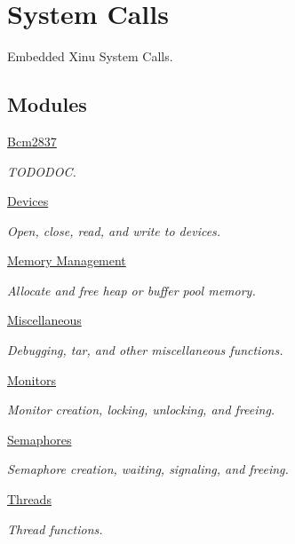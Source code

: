 \hypertarget{group__system}{\section{System Calls}
\label{group__system}
}


Embedded Xinu System Calls.  


\subsection*{Modules}
\begin{DoxyCompactItemize}
\item 
\hyperlink{group__bcm2837}{Bcm2837}
\begin{DoxyCompactList}\small\item\em T\-O\-D\-O\-D\-O\-C. \end{DoxyCompactList}\item 
\hyperlink{group__devcalls}{Devices}
\begin{DoxyCompactList}\small\item\em Open, close, read, and write to devices. \end{DoxyCompactList}\item 
\hyperlink{group__memory__mgmt}{Memory Management}
\begin{DoxyCompactList}\small\item\em Allocate and free heap or buffer pool memory. \end{DoxyCompactList}\item 
\hyperlink{group__misc}{Miscellaneous}
\begin{DoxyCompactList}\small\item\em Debugging, tar, and other miscellaneous functions. \end{DoxyCompactList}\item 
\hyperlink{group__monitors}{Monitors}
\begin{DoxyCompactList}\small\item\em Monitor creation, locking, unlocking, and freeing. \end{DoxyCompactList}\item 
\hyperlink{group__semaphores}{Semaphores}
\begin{DoxyCompactList}\small\item\em Semaphore creation, waiting, signaling, and freeing. \end{DoxyCompactList}\item 
\hyperlink{group__threads}{Threads}
\begin{DoxyCompactList}\small\item\em Thread functions. \end{DoxyCompactList}\item 

\end{DoxyCompactItemize}
